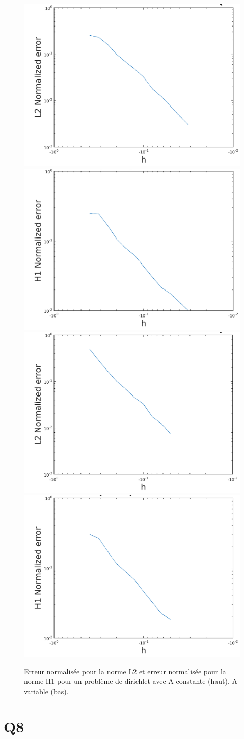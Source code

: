 \documentclass[11pt]{article}
\begin{document}
\begin{figure}
  \centering
  \includegraphics[width=.5\textwidth]{dirichlet/L2_Acst} 
  \includegraphics[width=.48\textwidth]{dirichlet/H1_Acst} \\
  \includegraphics[width=.48\textwidth]{dirichlet/L2_Avar} 
  \includegraphics[width=.48\textwidth]{dirichlet/H1_Avar}
  \caption{Erreur normalisée pour la norme L2 et erreur normalisée pour la norme H1 pour un problème de dirichlet avec A constante (haut), A variable (bas).}
  \label{fig:acst}
\end{figure}

\section{Q8}
\end{document}
